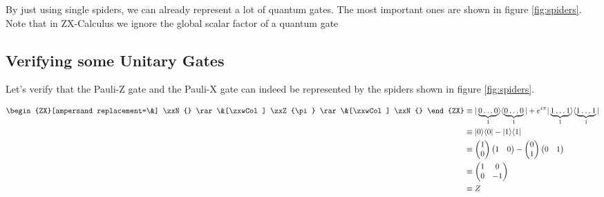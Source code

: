 By just using single spiders, we can already represent a lot of quantum gates. The most important ones are shown in figure \ref{fig:spiders}. Note that in ZX-Calculus we ignore the global scalar factor of a quantum gate

\subsection*{Verifying some Unitary Gates}

Let's verify that the Pauli-Z gate and the Pauli-X gate can indeed be represented by the spiders shown in figure \ref{fig:spiders}.


\begin{align}
    \begin{ZX}[ampersand replacement=\&]
        \zxN{} \rar \&[\zxwCol] \zxZ{\pi} \rar \&[\zxwCol] \zxN{}
    \end{ZX}
     & \equiv |\underbrace{0\dots 0}_{1}\rangle \langle \underbrace{0\dots0}_{1}| + e^{i\pi}|\underbrace{1\dots1}_{1}\rangle \langle \underbrace{1\dots1}_{1}| \\
     & \equiv
    |0\rangle \langle 0| - |1\rangle \langle 1|                                                                                                                \\
     & \equiv
    \begin{pmatrix}
        1 \\
        0 \\
    \end{pmatrix}
    \begin{pmatrix}
        1 & 0 \\
    \end{pmatrix}
    - \begin{pmatrix}
          0 \\
          1 \\
      \end{pmatrix}
    \begin{pmatrix}
        0 & 1 \\
    \end{pmatrix}                                                                                                                                             \\
     & \equiv
    \begin{pmatrix}
        1 & 0  \\
        0 & -1 \\
    \end{pmatrix}                                                                                                                                             \\
     & \equiv Z
\end{align}



